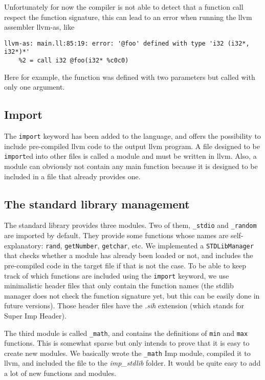 \documentclass[11pt]{article}
\begin{document}
Unfortunately for now the compiler is not able to detect that a function call respect the function signature, this can
lead to an error when running the llvm assembler \textsf{llvm-as}, like
\begin{verbatim}
llvm-as: main.ll:85:19: error: '@foo' defined with type 'i32 (i32*, i32*)*'
    %2 = call i32 @foo(i32* %c0c0)
\end{verbatim}
Here for example, the function was defined with two parameters but called with only one argument.

\subsection{Import}

The \texttt{import} keyword has been added to the language, and offers the possibility to
include pre-compiled llvm code to the output llvm program.
A file designed to be \texttt{import}ed into other files is called a module and must be written in llvm.
Also, a module can obviously not contain any main function because it is designed to be included in a
file that already provides one.

\subsection{The standard library management}

The standard library provides three modules. Two of them, \texttt{\_stdio} and \texttt{\_random} are imported by default.
They provide some functions whose names are self-explanatory: \texttt{rand}, \texttt{getNumber}, \texttt{getchar}, etc.
We implemented a \texttt{STDLibManager} that checks whether a module has already been loaded or not, and
includes the pre-compiled code in the target file if that is not the case.
To be able to keep track of which functions are included using the \texttt{import} keyword, we use minimalistic
header files that only contain the function names
(the stdlib manager does not check the function signature yet, but this can be easily done in future versions).
Those header files have the \textit{.sih} extension (which stands for Super Imp Header).

The third module is called \texttt{\_math}, and contains the definitions of \texttt{min} and \texttt{max} functions.
This is somewhat sparse but only intends to prove that it is easy to create new modules. We basically wrote the \texttt{\_math} Imp module,
compiled it to llvm, and included the file to the \textit{imp\_stdlib} folder. It would be quite easy to add a lot of new functions
and modules.
\end{document}
